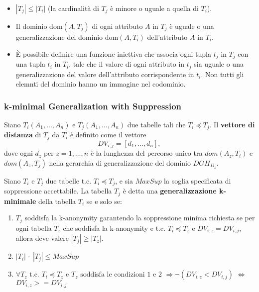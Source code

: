 \documentclass{report}
\begin{document}
\begin{itemize}
    \item \( |T_j| \leq |T_i| \) (la cardinalità di \( T_j \) è minore o uguale a quella di \( T_i \)).
    \item Il dominio \( \text{dom}(A,T_j) \) di ogni attributo \( A \) in \( T_j \) è uguale o una generalizzazione del dominio \( \text{dom}(A,T_i) \) dell'attributo \( A \) in \( T_i \).
    \item È possibile definire una funzione iniettiva che associa ogni tupla \( t_j \) in \( T_j \) con una tupla \( t_i \) in \( T_i \), tale che il valore di ogni attributo in \( t_j \) sia uguale o una generalizzazione del valore dell'attributo corrispondente in \( t_i \). Non tutti gli elemnti del dominio hanno un immagine nel codominio.
\end{itemize}

\subsubsection{k-minimal Generalization with Suppression}
Siano \( T_i(A_1, \ldots, A_n) \) e \( T_j(A_1, \ldots, A_n) \) due tabelle tali che \( T_i \preceq T_j \). Il \textbf{vettore di distanza} di \( T_j \) da \( T_i \) è definito come il vettore
\[
DV_{i,j} = [d_1, \ldots, d_n],
\] 
dove ogni \( d_z \) per \( z = 1, \ldots, n \) è la lunghezza del percorso unico tra \( dom(A_z, T_i) \) e \( dom(A_z, T_j) \) nella gerarchia di generalizzazione del dominio \( DGH_{D_z} \).

\noindent Siano \( T_i \) e \( T_j \) due tabelle t.c. \( T_i \preceq T_j \), e sia \( MaxSup \) la soglia specificata di soppressione accettabile. La tabella \( T_j \) è detta una \textbf{generalizzazione k-minimale} della tabella \( T_i \) se e solo se:

\begin{enumerate}
    \item \( T_j \) soddisfa la k-anonymity garantendo la soppressione minima richiesta se per ogni tabella \( T_z \) che soddisfa la k-anonymity e t.c. \( T_i \preceq T_z \) e \( DV_{i,z} = DV_{i,j} \), allora deve valere \( |T_j| \geq |T_z| \).
    \item \( |T_i| \text{ - } |T_j| \leq MaxSup \)
    \item \( \forall T_z \text{ t.c. } T_i \preceq T_z \text{ e } T_z \text{ soddisfa le condizioni 1 e 2 } \Rightarrow \neg(DV_{i,z} < DV_{i,j}) \) $ \iff $ \(DV_{i,z} >= DV_{i,j} \)
\end{enumerate}
\end{document}
